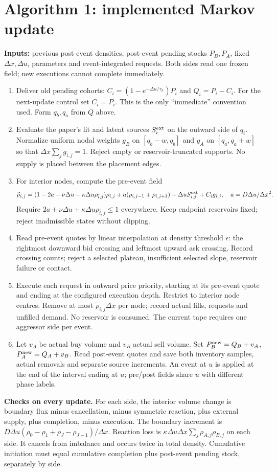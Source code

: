 \documentclass[11pt,a4paper]{article}
\newcommand{\du}{\Delta u}\newcommand{\dx}{\Delta x}
\begin{document}
\section{Algorithm 1: implemented Markov update}
\textbf{Inputs:} previous post-event densities, post-event pending stocks
$P_B,P_A$, fixed $\dx,\du$, parameters and event-integrated requests.
Both sides read one frozen field; new executions cannot complete immediately.
\begin{enumerate}
\item Deliver old pending cohorts:
$C_i=(1-e^{-\du/\tau_h})P_i$ and $Q_i=P_i-C_i$.
For the next-update control set $C_i=P_i$. This is the only
``immediate'' convention used. Form $q_b,q_a$ from $Q$ above.
\item Evaluate the paper's lit and latent sources $S_i^{\rm ext}$ on the
outward side of $q_i$. Normalize uniform nodal weights $g_B$ on
$[q_b-w,q_b]$ and $g_A$ on $[q_a,q_a+w]$ so that $\dx\sum_jg_{i,j}=1$.
Reject empty or reservoir-truncated supports. No supply is placed between
the placement edges.
\item For interior nodes, compute the pre-event field
\[
 \widetilde\rho_{i,j}=(1-2a-\nu\du-\kappa\du\rho_{\bar i,j})\rho_{i,j}
 +a(\rho_{i,j-1}+\rho_{i,j+1})+\du S_{i,j}^{\rm ext}+C_i g_{i,j},
 \quad a=D\du/\dx^2.
\]
Require $2a+\nu\du+\kappa\du\rho_{\bar i,j}\leq1$ everywhere.
Keep endpoint reservoirs fixed; reject inadmissible states without clipping.
\item Read pre-event quotes by linear interpolation at density threshold
$\epsilon$: the rightmost downward bid crossing and leftmost upward ask
crossing. Record crossing counts; reject a selected plateau, insufficient
selected slope, reservoir failure or contact.
\item Execute each request in outward price priority, starting at its
pre-event quote and ending at the configured execution depth. Restrict to
interior node centres. Remove at most $\widetilde\rho_{i,j}\dx$ per node;
record actual fills, requests and unfilled demand. No reservoir is consumed.
The current tape requires one aggressor side per event.
\item Let $v_A$ be actual buy volume and $v_B$ actual sell volume. Set
$P_B^{\rm new}=Q_B+v_A$, $P_A^{\rm new}=Q_A+v_B$.
Read post-event quotes and save both inventory samples, actual removals and
separate source increments. An event at $u$ is applied at the end of the
interval ending at $u$; pre/post fields share $u$ with different phase labels.
\end{enumerate}
\textbf{Checks on every update.} For each side, the interior volume change is
boundary flux minus cancellation, minus symmetric reaction, plus external
supply, plus completion, minus execution. The boundary increment is
$D\du(\rho_0-\rho_1+\rho_J-\rho_{J-1})/\dx$. Reaction loss is
$\kappa\du\dx\sum_j\rho_{A,j}\rho_{B,j}$ on each side. It cancels from
imbalance and occurs twice in total density. Cumulative initiation must equal
cumulative completion plus post-event pending stock, separately by side.
\end{document}
